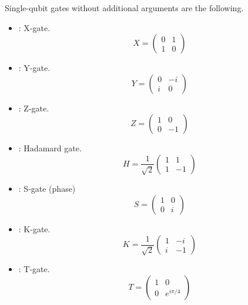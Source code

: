 Single-qubit gates without additional arguments are the following.
\begin{itemize}
  \item {}: X-gate.
        \begin{equation}
          \label{netqasm:eq:pauli_x}
          X = \begin{pmatrix} 0 & 1 \\ 1 & 0 \end{pmatrix}
        \end{equation}
  \item {}: Y-gate.
        \begin{equation}
          \label{netqasm:eq:pauli_y}
          Y = \begin{pmatrix} 0 & -i \\ i & 0 \end{pmatrix}
        \end{equation}
  \item {}: Z-gate.
        \begin{equation}
          \label{netqasm:eq:pauli_z}
          Z = \begin{pmatrix} 1 & 0 \\ 0 & -1 \end{pmatrix}
        \end{equation}
  \item {}: Hadamard gate.
        \begin{equation}
          H = \frac{1}{\sqrt{2}} \begin{pmatrix} 1 & 1 \\ 1 & -1 \end{pmatrix}
        \end{equation}
  \item {}: S-gate (phase)
        \begin{equation}
          S = \begin{pmatrix} 1 & 0 \\ 0 & i \end{pmatrix}
        \end{equation}
  \item {}: K-gate.
        \begin{equation}
          K = \frac{1}{\sqrt{2}} \begin{pmatrix} 1 & -i \\ i & -1 \end{pmatrix}
        \end{equation}
  \item {}: T-gate.
        \begin{equation}
          T = \begin{pmatrix} 1 & 0 \\ 0 & e^{i\pi/4} \end{pmatrix}
        \end{equation}
\end{itemize}

